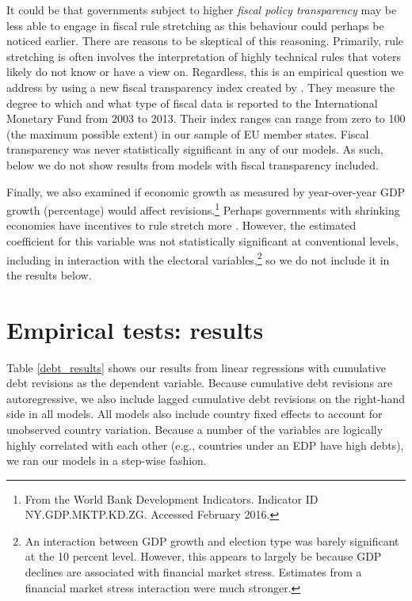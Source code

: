 \documentclass[]{article}
\begin{document}
It could be that governments subject to higher \emph{fiscal policy transparency} may be less able to engage in fiscal rule stretching as this behaviour could perhaps be noticed earlier. There are reasons to be skeptical of this reasoning. Primarily, rule stretching is often involves the interpretation of highly technical rules that voters likely do not know or have a view on. Regardless, this is an empirical question we address by using a new fiscal transparency index created by \cite{Wang2015}. They measure the degree to which and what type of fiscal data is reported to the International Monetary Fund from 2003 to 2013. Their index ranges can range from zero to 100 (the maximum possible extent) in our sample of EU member states. Fiscal transparency was never statistically significant in any of our models. As such, below we do not show results from models with fiscal transparency included.

Finally, we also examined if economic growth as measured by year-over-year GDP growth (percentage) would affect revisions.\footnote{From the World Bank Development Indicators. Indicator ID NY.GDP.MKTP.KD.ZG. Accessed February 2016.} Perhaps governments with shrinking economies have incentives to rule stretch more \citep{DeCastro2013}. However, the estimated coefficient for this variable was not statistically significant at conventional levels, including in interaction with the electoral variables,\footnote{An interaction between GDP growth and election type was barely significant at the 10 percent level. However, this appears to largely be because GDP declines are associated with financial market stress. Estimates from a financial market stress interaction were much stronger.} so we do not include it in the results below.

\section{Empirical tests: results}

Table \ref{debt_results} shows our results from linear regressions with cumulative debt revisions as the dependent variable. Because cumulative debt revisions are autoregressive, we also include lagged cumulative debt revisions on the right-hand side in all models. All models also include country fixed effects to account for unobserved country variation. Because a number of the variables are logically highly correlated with each other (e.g., countries under an EDP have high debts), we ran our models in a step-wise fashion.
\end{document}

